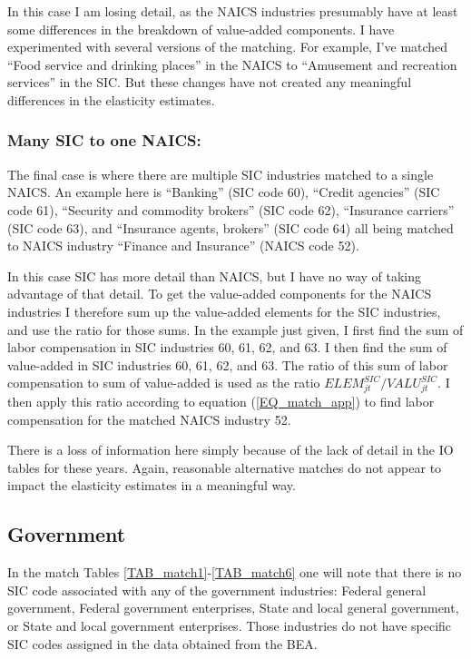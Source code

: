 \documentclass[11pt]{article}
\begin{document}
In this case I am losing detail, as the NAICS industries presumably have at least some differences in the breakdown of value-added components. I have experimented with several versions of the matching. For example, I've matched ``Food service and drinking places'' in the NAICS to ``Amusement and recreation services'' in the SIC. But these changes have not created any meaningful differences in the elasticity estimates.

\subsubsection{Many SIC to one NAICS:} The final case is where there are multiple SIC industries matched to a single NAICS. An example here is ``Banking'' (SIC code 60), ``Credit agencies'' (SIC code 61), ``Security and commodity brokers'' (SIC code 62), ``Insurance carriers'' (SIC code 63), and ``Insurance agents, brokers'' (SIC code 64) all being matched to NAICS industry ``Finance and Insurance'' (NAICS code 52). 

In this case SIC has more detail than NAICS, but I have no way of taking advantage of that detail. To get the value-added components for the NAICS industries I therefore sum up the value-added elements for the SIC industries, and use the ratio for those sums. In the example just given, I first find the sum of labor compensation in SIC industries 60, 61, 62, and 63. I then find the sum of value-added in SIC industries 60, 61, 62, and 63. The ratio of this sum of labor compensation to sum of value-added is used as the ratio $ELEM_{jt}^{SIC}/VALU_{jt}^{SIC}$. I then apply this ratio according to equation (\ref{EQ_match_app}) to find labor compensation for the matched NAICS industry 52. 

There is a loss of information here simply because of the lack of detail in the IO tables for these years. Again, reasonable alternative matches do not appear to impact the elasticity estimates in a meaningful way.

\subsection{Government}
In the match Tables \ref{TAB_match1}-\ref{TAB_match6} one will note that there is no SIC code associated with any of the government industries: Federal general government, Federal government enterprises, State and local general government, or State and local government enterprises. Those industries do not have specific SIC codes assigned in the data obtained from the BEA. 
\end{document}

